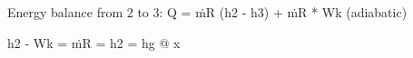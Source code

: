 Energy balance from 2 to 3:  
Q = ṁR (h2 - h3) + ṁR * Wk (adiabatic)  

h2 - Wk = ṁR = h2 = hg @ x
